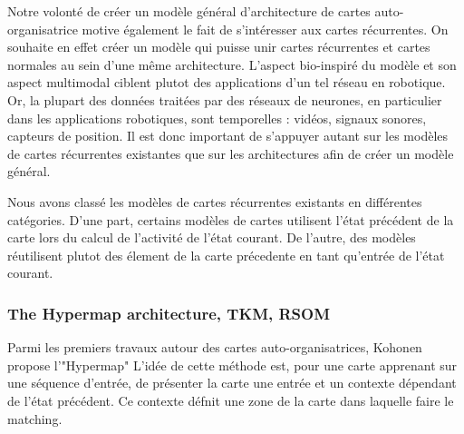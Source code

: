 \documentclass[../main]{subfiles}
\begin{document}
Notre volonté de créer un modèle général d'architecture de cartes auto-organisatrice motive également le fait de s'intéresser aux cartes récurrentes. On souhaite en effet créer un modèle qui puisse unir cartes récurrentes et cartes normales au sein d'une même architecture. L'aspect bio-inspiré du modèle et son aspect multimodal ciblent plutot des applications d'un tel réseau en robotique. Or, la plupart des données traitées par des réseaux de neurones, en particulier dans les applications robotiques, sont temporelles : vidéos, signaux sonores, capteurs de position. Il est donc important de s'appuyer autant sur les modèles de cartes récurrentes existantes que sur les architectures afin de créer un modèle général. 


Nous avons classé les modèles de cartes récurrentes existants en différentes catégories. D'une part, certains modèles de cartes utilisent l'état précédent de la carte lors du calcul de l'activité de l'état courant. De l'autre, des modèles réutilisent plutot des élement de la carte précedente en tant qu'entrée de l'état courant.



\subsubsection{The Hypermap architecture, TKM, RSOM}
Parmi les premiers travaux autour des cartes auto-organisatrices, Kohonen propose l'"Hypermap" \cite{Kohonen1991THEHA} L'idée de cette méthode est, pour une carte apprenant sur une séquence d'entrée, de présenter la carte une entrée et un contexte dépendant de l'état précédent. Ce contexte défnit une zone de la carte dans laquelle faire le matching.
\end{document}
